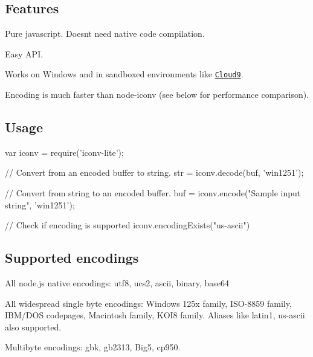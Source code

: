 \href{http://travis-ci.org/ashtuchkin/iconv-lite}{\tt }

\subsection*{Features}


\begin{DoxyItemize}
\item Pure javascript. Doesn\textquotesingle{}t need native code compilation.
\item Easy A\+PI.
\item Works on Windows and in sandboxed environments like \href{http://c9.io}{\tt Cloud9}.
\item Encoding is much faster than node-\/iconv (see below for performance comparison).
\end{DoxyItemize}

\subsection*{Usage}

\begin{DoxyVerb}var iconv = require('iconv-lite');

// Convert from an encoded buffer to string.
str = iconv.decode(buf, 'win1251');

// Convert from string to an encoded buffer.
buf = iconv.encode("Sample input string", 'win1251');

// Check if encoding is supported
iconv.encodingExists("us-ascii")
\end{DoxyVerb}


\subsection*{Supported encodings}


\begin{DoxyItemize}
\item All node.\+js native encodings\+: \textquotesingle{}utf8\textquotesingle{}, \textquotesingle{}ucs2\textquotesingle{}, \textquotesingle{}ascii\textquotesingle{}, \textquotesingle{}binary\textquotesingle{}, \textquotesingle{}base64\textquotesingle{}
\item All widespread single byte encodings\+: Windows 125x family, I\+S\+O-\/8859 family, I\+B\+M/\+D\+OS codepages, Macintosh family, K\+O\+I8 family. Aliases like \textquotesingle{}latin1\textquotesingle{}, \textquotesingle{}us-\/ascii\textquotesingle{} also supported.
\item Multibyte encodings\+: \textquotesingle{}gbk\textquotesingle{}, \textquotesingle{}gb2313\textquotesingle{}, \textquotesingle{}Big5\textquotesingle{}, \textquotesingle{}cp950\textquotesingle{}.
\end{DoxyItemize}

